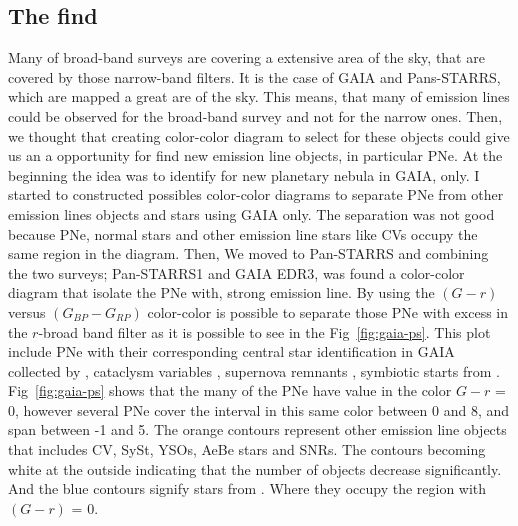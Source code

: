 \documentclass[fleqn,usenatbib]{mnras}
\begin{document}
\subsection{The find}
\label{sec:find}

Many of broad-band surveys are covering a extensive area of the sky, that
are covered by those narrow-band filters. It is the case of GAIA and Pans-STARRS, which
are mapped a great are of the sky.
This means, that many of emission lines could be observed for the broad-band
survey and not for the narrow ones. Then, we thought that creating color-color
diagram to select for these objects
could give us an a opportunity for find new emission line objects, in particular PNe.
At the beginning the idea was to identify for new planetary nebula in GAIA, only.
I started to constructed possibles color-color diagrams to separate PNe from
other emission lines objects and stars using GAIA only. The separation was not
good because PNe, normal stars and other emission line stars like CVs occupy the
same region in the diagram. Then, We moved to Pan-STARRS and combining the two
surveys; Pan-STARRS1 and GAIA EDR3, was found a color-color diagram that isolate the PNe
with, strong \ha{} emission line. By using the \((G - r)\) versus \((G_{BP} - G_{RP})\)
color-color is possible to separate those PNe with excess in the $r$-broad band
filter as it is possible to see in the Fig~\ref{fig:gaia-ps}. This plot include PNe
with their corresponding central star identification in GAIA collected by \citet{Gonzalez:2021}, 
cataclysm variables \citep{Downes:2006}, supernova remnants \citep{Green:2019}, symbiotic starts
from \citet{Akras:2019a}.  
Fig~\ref{fig:gaia-ps} shows that the many of the PNe have value in
the color \(G - r\) = 0, however several PNe cover the interval in this
same color between 0 and 8, and span between -1 and 5.
The orange contours represent other emission line objects that includes CV, SySt,
YSOs, AeBe stars and SNRs. The contours becoming white at the outside indicating
that the number of objects decrease significantly. And the blue contours signify
stars from \citet{Smart:2021}. Where they occupy the region with \((G - r)\) = 0.
\end{document}
